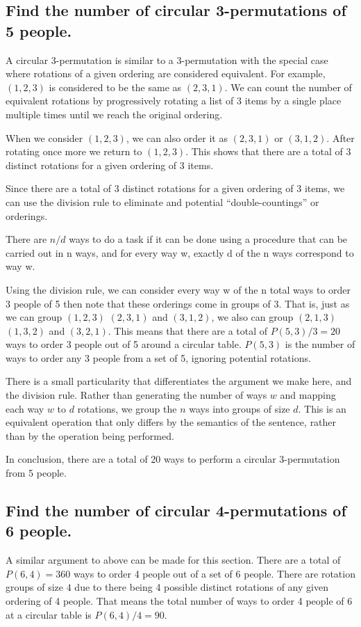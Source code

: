 \subsection{Find the number of circular 3-permutations of 5 people.}
A circular 3-permutation is similar to a 3-permutation with the special case where rotations of a given ordering are considered equivalent. For example, $(1,2,3)$ is considered to be the same as $(2,3,1)$. We can count the number of equivalent rotations by progressively rotating a list of 3 items by a single place multiple times until we reach the original ordering.

When we consider $(1,2,3)$, we can also order it as $(2,3,1)$ or $(3,1,2)$. After rotating once more we return to $(1,2,3)$. This shows that there are a total of 3 distinct rotations for a given ordering of 3 items.

Since there are a total of 3 distinct rotations for a given ordering of 3 items, we can use the division rule to eliminate and potential ``double-countings'' or orderings.

\begin{theo}
There are $n/d$ ways to do a task if it can be done using a procedure
that can be carried out in n ways, and for every way w, exactly d of the n ways correspond
to way w.
\label{theo:DT}
\end{theo}

Using the division rule, we can consider every way w of the n total ways to order 3 people of 5 then note that these orderings come in groups of 3. That is, just as we can group $(1,2,3)$ $(2,3,1)$ and $(3,1,2)$, we also can group $(2,1,3)$ $(1,3,2)$ and $(3,2,1)$. This means that there are  a total of $P(5,3) / 3 = 20$ ways to order 3 people out of 5 around a circular table. $P(5,3)$ is the number of ways to order any 3 people from a set of 5, ignoring potential rotations.

There is a small particularity that differentiates the argument we make here, and the division rule. Rather than generating the number of ways $w$ and mapping each way $w$ to $d$ rotations, we group the $n$ ways into groups of size $d$. This is an equivalent operation that only differs by the semantics of the sentence, rather than by the operation being performed.

In conclusion, there are a total of 20 ways to perform a circular 3-permutation from 5 people.  

\subsection{Find the number of circular 4-permutations of 6 people.}
A similar argument to above can be made for this section. There are a total of $P(6,4) = 360$ ways to order 4 people out of a set of 6 people. There are rotation groups of size $4$ due to there being 4 possible distinct rotations of any given ordering of 4 people. That means the total number of ways to order 4 people of 6 at a circular table is $P(6,4) / 4 = 90$.

